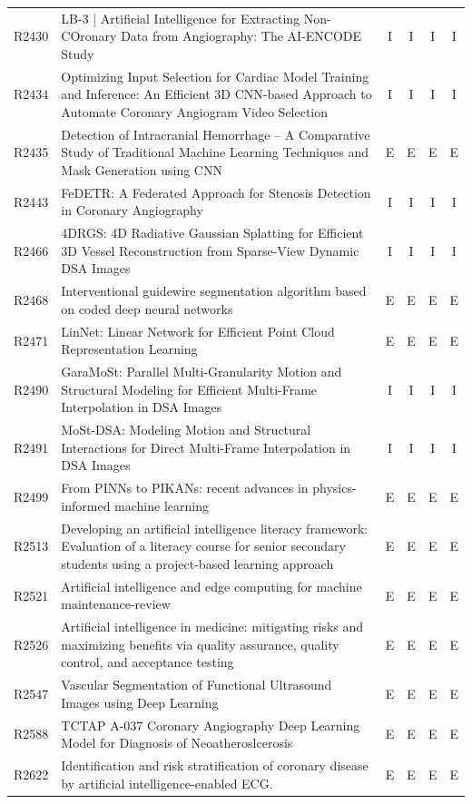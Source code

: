 \begin{longtable}{@{}l p{8.6cm} c c c c@{}}
R2430 & LB-3 | Artificial Intelligence for Extracting Non-COronary Data from Angiography: The AI-ENCODE Study & I & I & I & I \\
R2434 & Optimizing Input Selection for Cardiac Model Training and Inference: An Efficient 3D CNN-based Approach to Automate Coronary Angiogram Video Selection & I & I & I & I \\
R2435 & Detection of Intracranial Hemorrhage – A Comparative Study of Traditional Machine Learning Techniques and Mask Generation using CNN & E & E & E & E \\
R2443 & FeDETR: A Federated Approach for Stenosis Detection in Coronary Angiography & I & I & I & I \\
R2466 & 4DRGS: 4D Radiative Gaussian Splatting for Efficient 3D Vessel Reconstruction from Sparse-View Dynamic DSA Images & I & I & I & I \\
R2468 & Interventional guidewire segmentation algorithm based on coded deep neural networks & E & E & E & E \\
R2471 & LinNet: Linear Network for Efficient Point Cloud Representation Learning & E & E & E & E \\
R2490 & GaraMoSt: Parallel Multi-Granularity Motion and Structural Modeling for Efficient Multi-Frame Interpolation in DSA Images & I & I & I & I \\
R2491 & MoSt-DSA: Modeling Motion and Structural Interactions for Direct Multi-Frame Interpolation in DSA Images & I & I & I & I \\
R2499 & From PINNs to PIKANs: recent advances in physics-informed machine learning & E & E & E & E \\
R2513 & Developing an artificial intelligence literacy framework: Evaluation of a literacy course for senior secondary students using a project-based learning approach & E & E & E & E \\
R2521 & Artificial intelligence and edge computing for machine maintenance-review & E & E & E & E \\
R2526 & Artificial intelligence in medicine: mitigating risks and maximizing benefits via quality assurance, quality control, and acceptance testing & E & E & E & E \\
R2547 & Vascular Segmentation of Functional Ultrasound Images using Deep Learning & E & E & E & E \\
R2588 & TCTAP A-037 Coronary Angiography Deep Learning Model for Diagnosis of Neoatheroslcerosis & E & E & E & E \\
R2622 & Identification and risk stratification of coronary disease by artificial intelligence-enabled ECG. & E & E & E & E \\

\end{longtable}

